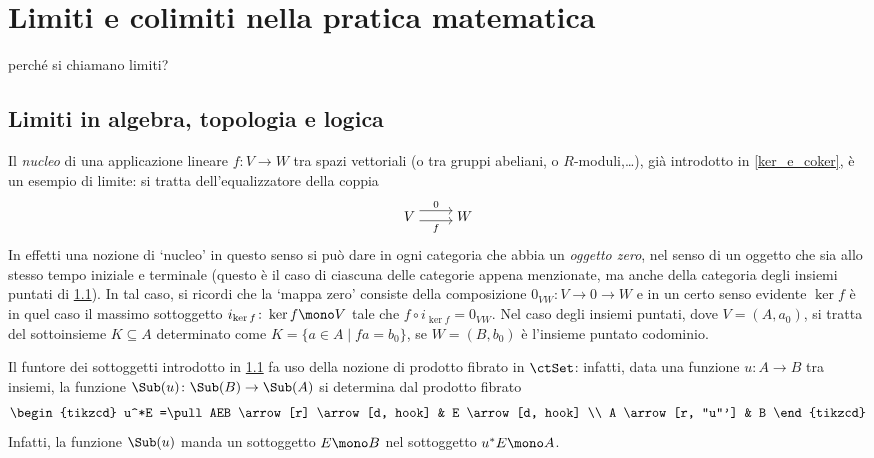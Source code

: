 \section{Limiti e colimiti nella pratica matematica}
\color{red}
perché si chiamano limiti?
\begin{remark}
\end{remark}
\subsection{Limiti in algebra, topologia e logica}
\begin{example}
	Il \emph{nucleo} di una applicazione lineare \(f \colon V \to W\) tra spazi vettoriali (o tra gruppi abeliani, o \(R\)-moduli,\dots), già introdotto in \ref{ker_e_coker}, è un esempio di limite: si tratta dell'equalizzatore della coppia
	\[\begin{tikzcd}[cramped]
			V & W
			\arrow["0", shift left=2, from=1-1, to=1-2]
			\arrow["f"', shift right, from=1-1, to=1-2]
		\end{tikzcd}\]
	In effetti una nozione di `nucleo' in questo senso si può dare in ogni categoria che abbia un \emph{oggetto zero}, nel senso di un oggetto che sia allo stesso tempo iniziale e terminale (questo è il caso di ciascuna delle categorie appena menzionate, ma anche della categoria degli insiemi puntati di \ref{}). In tal caso, si ricordi che la `mappa zero' consiste della composizione \(0_{VW} \colon V \to 0 \to W\) e in un certo senso evidente \(\ker f\) è in quel caso il massimo sottoggetto \(i_{\ker f} \colon \ker f \mono V\) tale che \(f\circ i_{\ker f} = 0_{VW}\). Nel caso degli insiemi puntati, dove \(V=(A,a_0)\), si tratta del sottoinsieme \(K\subseteq A\) determinato come \(K=\{a\in A\mid fa = b_0\}\), se \(W=(B,b_0)\) è l'insieme puntato codominio.
\end{example}
\begin{example}
	Il funtore dei sottoggetti introdotto in \ref{} fa uso della nozione di prodotto fibrato in \(\ctSet\): infatti, data una funzione \(u \colon A\to B\) tra insiemi, la funzione \(\Sub(u) \colon \Sub(B) \to \Sub(A)\) si determina dal prodotto fibrato
	\[\begin{tikzcd}
			u^*E =\pull AEB \arrow[r] \arrow[d, hook] & E \arrow[d, hook] \\
			A \arrow[r, "u"'] & B
		\end{tikzcd}\]
	Infatti, la funzione \(\Sub(u)\) manda un sottoggetto \(E\mono B\) nel sottoggetto \(u^*E\mono A\).
\end{example}
